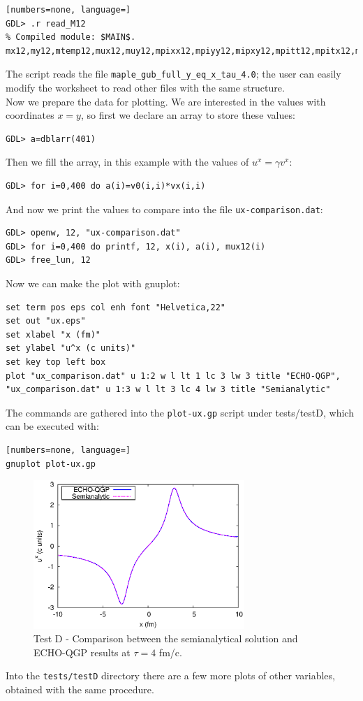 \begin{lstlisting}[numbers=none, language=]
GDL> .r read_M12
% Compiled module: $MAIN$.
mx12,my12,mtemp12,mux12,muy12,mpixx12,mpiyy12,mipxy12,mpitt12,mpitx12,mpity12,mpizz12
\end{lstlisting}
The script reads the file {\tt maple\_gub\_full\_y\_eq\_x\_tau\_4.0}; the user can easily modify the worksheet to read other files with the same structure.\\
Now we prepare the data for plotting. We are interested in the values with coordinates $x=y$, so first we declare an array to store these values:
\begin{lstlisting}[numbers=none, language=IDL]
GDL> a=dblarr(401)
\end{lstlisting}
Then we fill the array, in this example with the values of $u^x=\gamma v^x$:
\begin{lstlisting}[numbers=none, language=IDL]
GDL> for i=0,400 do a(i)=v0(i,i)*vx(i,i)
\end{lstlisting}
And now we print the values to compare into the file {\tt ux-comparison.dat}:
\begin{lstlisting}[numbers=none, language=IDL]
GDL> openw, 12, "ux-comparison.dat"
GDL> for i=0,400 do printf, 12, x(i), a(i), mux12(i)
GDL> free_lun, 12
\end{lstlisting}
Now we can make the plot with gnuplot:
\begin{lstlisting}[numbers=none, language=Gnuplot]
set term pos eps col enh font "Helvetica,22"
set out "ux.eps"
set xlabel "x (fm)"
set ylabel "u^x (c units)"
set key top left box
plot "ux_comparison.dat" u 1:2 w l lt 1 lc 3 lw 3 title "ECHO-QGP", "ux_comparison.dat" u 1:3 w l lt 3 lc 4 lw 3 title "Semianalytic"
\end{lstlisting}
The commands are gathered into the {\tt plot-ux.gp} script under tests/testD, which can be executed with:
\begin{lstlisting}[numbers=none, language=]
gnuplot plot-ux.gp
\end{lstlisting}
\begin{figure}[!h]
 \begin{center}
  \includegraphics[width=8cm]{images/ux-testD.eps}
   \caption{Test D - Comparison between the semianalytical solution and ECHO-QGP results at $\tau=4$ fm/c.}
    \label{fig:testD1}
 \end{center}
\end{figure}
Into the {\tt tests/testD} directory there are a few more plots of other variables, obtained with the same procedure.\\
